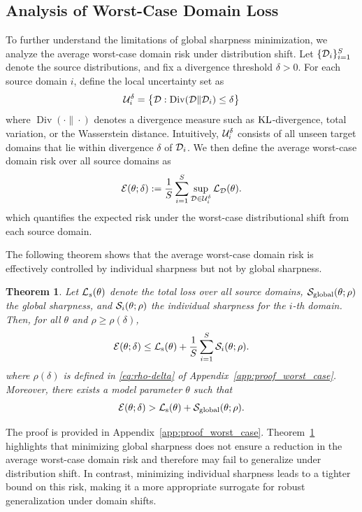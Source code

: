 \documentclass{article}
\theoremstyle{plain}
\newtheorem{theorem}{Theorem}[section]
\theoremstyle{definition}
\theoremstyle{remark}
\DeclareMathOperator{\Div}{Div}
\begin{document}

\subsection{Analysis of Worst-Case Domain Loss}\label{subsec:worst-case}

To further understand the limitations of global sharpness minimization, we analyze the average worst-case domain risk under distribution shift. Let $\{{\mathcal{D}}_i\}_{i=1}^S$ denote the source distributions, and fix a divergence threshold $\delta>0$. For each source domain $i$, define the local uncertainty set as
\[
\gU_i^\delta=\bigl\{\gD : \Div(\gD \| \gD_i)\le\delta\bigr\}
\]
where $\Div(\cdot \| \cdot)$ denotes a divergence measure such as $\mathrm{KL}$-divergence, total variation, or the Wasserstein distance. Intuitively, ${\mathcal{U}}_i^\delta$ consists of all unseen target domains that lie within divergence $\delta$ of ${\mathcal{D}}_i$. We then define the average worst-case domain risk over all source domains as 
\[
{\mathcal{E}}(\theta;\delta):= \frac{1}{S}\sum_{i=1}^S \sup_{{\mathcal{D}}\in{\mathcal{U}}_i^\delta}{\mathcal{L}}_{{\mathcal{D}}}(\theta).
\]
which quantifies the expected risk under the worst-case distributional shift from each source domain. 

The following theorem shows that the average worst-case domain risk is effectively controlled by individual sharpness but not by global sharpness. 

\begin{theorem}\label{thm:worst-case}
Let \({\mathcal{L}}_s(\theta)\) denote the total loss over all source domains, \({\mathcal{S}}_{\text{global}}(\theta;\rho)\) the global sharpness, and \({\mathcal{S}}_i(\theta;\rho)\) the individual sharpness for the \(i\)-th domain. Then, for all $\theta$ and $\rho \geq \rho(\delta)$,
\[
{\mathcal{E}}(\theta;\delta) \leq  {\mathcal{L}}_{\text{s}}(\theta)
  + \frac{1}{S}\sum_{i=1}^S {\mathcal{S}}_i(\theta;\rho).
\]
where $\rho(\delta)$ is defined in \eqref{eq:rho-delta} of Appendix~\ref{app:proof_worst_case}. Moreover, there exists a model parameter $\theta$ such that 
\[
{\mathcal{E}}(\theta;\delta) >  {\mathcal{L}}_{\text{s}}(\theta)
  +  {\mathcal{S}}_{\text{global}}(\theta;\rho).
\]
\end{theorem}
The proof is provided in Appendix~\ref{app:proof_worst_case}. Theorem~\ref{thm:worst-case} highlights that minimizing global sharpness does not ensure a reduction in the average worst-case domain risk and therefore may fail to generalize under distribution shift. In contrast, minimizing individual sharpness leads to a tighter bound on this risk, making it a more appropriate surrogate for robust generalization under domain shifts. 
\end{document}
